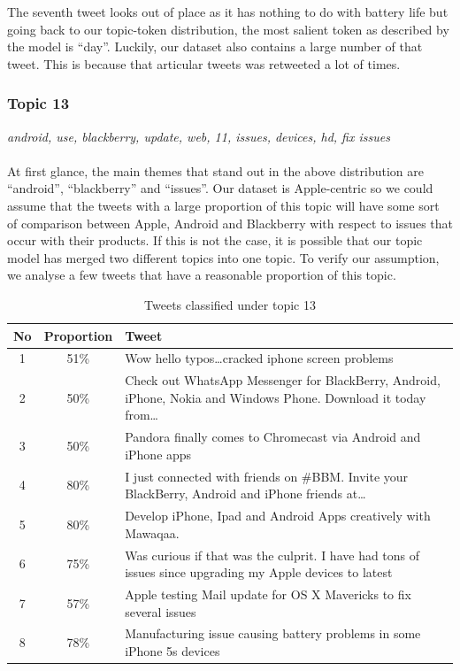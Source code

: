 The seventh tweet looks out of place as it has nothing to do with battery life but
going back to our topic-token distribution, the most salient token as described by the model is
``day''. Luckily, our dataset also contains a large number of that tweet. This is because that
articular tweets was retweeted a lot of times.


\subsubsection{Topic 13}
\label{sec:topic-13}
\textit{android, use, blackberry, update, web, 11, issues, devices, hd, fix issues}\\\\
At first glance, the main themes that stand out in the above distribution are ``android'',
``blackberry'' and ``issues''. Our dataset is Apple-centric so we could assume that the tweets with
a large proportion of this topic will have some sort of comparison between Apple, Android and
Blackberry with respect to issues that occur with their products. If this is not the case, it is
possible that our topic model has merged two different topics into one topic. To verify our
assumption, we analyse a few tweets that have a reasonable proportion of this topic.

\begin{table}[H]
  \begin{tabular}{c c p{13cm}} \toprule
    No & Proportion & Tweet \\ \midrule
    1  & 51\%       & Wow hello typos\ldots cracked iphone screen problems \\ \midrule
    2  & 50\%       & Check out WhatsApp Messenger for BlackBerry, Android, iPhone, Nokia and Windows Phone. Download it today from\ldots \\ \midrule
    3  & 50\%       & Pandora finally comes to Chromecast via Android and iPhone apps \\ \midrule
    4  & 80\%       & I just connected with friends on \#BBM\@. Invite your BlackBerry, Android and iPhone friends at\ldots \\ \midrule
    5  & 80\%       & Develop iPhone, Ipad and Android Apps creatively with Mawaqaa. \\ \midrule
    6  & 75\%       & Was curious if that was the culprit. I have had tons of issues since upgrading my Apple devices to latest \\ \midrule
    7  & 57\%       & Apple testing Mail update for OS X Mavericks to fix several issues \\ \midrule
    8  & 78\%       & Manufacturing issue causing battery problems in some iPhone 5s devices \\ \bottomrule
  \end{tabular}
  \caption{Tweets classified under topic 13}
  \label{tab:topic-13-tweets}
\end{table}


